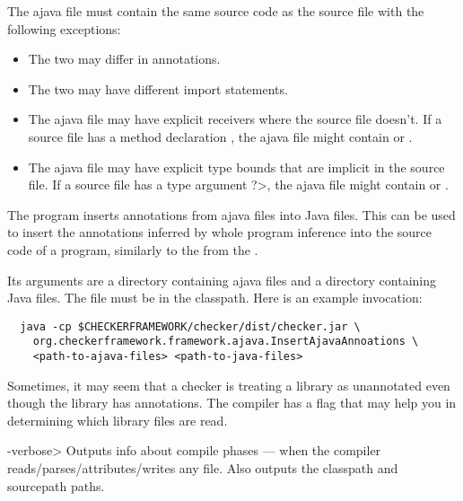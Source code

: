 The
ajava file must contain the same source code as the source file with the following exceptions:
\begin{itemize}
  \item The two may differ in annotations.
  \item The two may have different import statements.
  \item The ajava file may have explicit receivers where the source file
    doesn't. If a source file has a method declaration , the ajava file might contain  or .
  \item The ajava file may have explicit type bounds that are implicit in the source file.
    If a source file has a type argument \<?>,
    the ajava file might contain  or .
\end{itemize}



The  program inserts annotations
from ajava files into Java files.  This can be used to
insert the annotations inferred by whole program inference into the source code
of a program, similarly to the
 from the
.

Its arguments are a directory containing ajava files and a directory
containing Java files.  The  file must be in the classpath.
Here is an example invocation:
\begin{Verbatim}
  java -cp $CHECKERFRAMEWORK/checker/dist/checker.jar \
    org.checkerframework.framework.ajava.InsertAjavaAnnoations \
    <path-to-ajava-files> <path-to-java-files>
\end{Verbatim}



Sometimes, it may seem that a checker is treating a library as unannotated
even though the library has annotations.  The compiler has a flag that
may help you in determining which library files are read.

\begin{description}
\item \<-verbose>
  Outputs info about compile phases --- when the compiler
  reads/parses/attributes/writes any file.  Also outputs the classpath and
  sourcepath paths.
\end{description}

